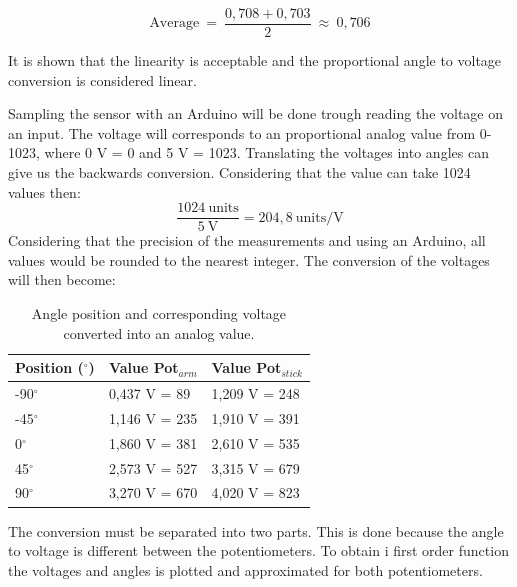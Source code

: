 \begin{equation}
\text{Average}\ =\ \dfrac{0,708 + 0,703}{2}\ \approx\ 0,706 
\end{equation}

It is shown that the linearity is acceptable and the proportional angle to voltage conversion is considered linear.


Sampling the sensor with an Arduino will be done trough reading the voltage on an input. The voltage will corresponds to an proportional analog value from 0-1023, where 0 V = 0 and 5 V = 1023. Translating the voltages into angles can give us the backwards conversion. Considering that the value can take 1024 values then:
\begin{equation}
\dfrac{1024\ \text{units}}{5\ \text{V}} = 204,8\ \text{units/V}
\end{equation}     
Considering that the precision of the measurements and using an Arduino, all values would be rounded to the nearest integer. The conversion of the voltages will then become:
\begin{table}[htbp]
\centering
\begin{tabular}{lll}
\hline
Position ($^\circ$) & Value Pot$_{arm}$ & Value Pot$_{stick}$ \\ \hline
-90$^\circ$         & 0,437 V = 89         & 1,209 V = 248                   \\
-45$^\circ$         & 1,146 V = 235        & 1,910 V = 391                   \\
0$^\circ$           & 1,860 V = 381    & 2,610 V = 535                    \\
45$^\circ$          & 2,573 V = 527    & 3,315 V = 679                   \\
90$^\circ$          & 3,270 V = 670   & 4,020 V = 823                  
\end{tabular}
\caption{Angle position and corresponding voltage converted into an analog value.}
\label{AngleTable}
\end{table}

The conversion must be separated into two parts. This is done because the angle to voltage is different between the potentiometers.
\newpage
To obtain i first order function the voltages and angles is plotted and approximated for both potentiometers.


